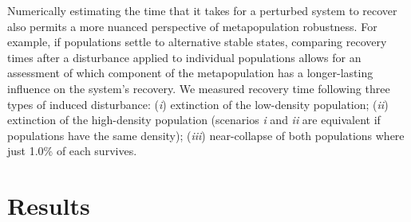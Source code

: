 \documentclass{revtex4}
\begin{document}
Numerically estimating the time that it takes for a perturbed system to recover also permits a more nuanced perspective of metapopulation robustness.
For example, if populations settle to alternative stable states, comparing recovery times after a disturbance applied to individual populations allows for an assessment of which component of the metapopulation has a longer-lasting influence on the system's recovery.
We measured recovery time following three types of induced disturbance: (\emph{i}) extinction of the low-density population; (\emph{ii}) extinction of the high-density population (scenarios \emph{i} and \emph{ii} are equivalent if populations have the same density); (\emph{iii}) near-collapse of both populations where just 1.0\% of each survives.
\\


\section{Results}

\end{document}
